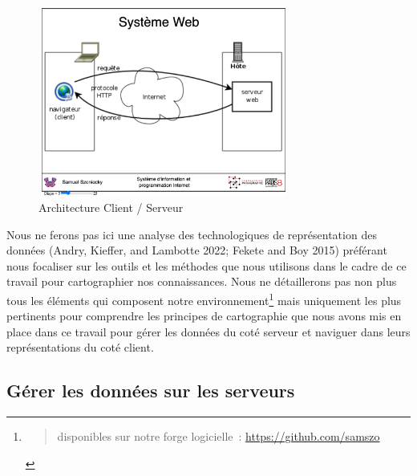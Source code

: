 \documentclass[
  letterpaper,
  DIV=11,
  numbers=noendperiod]{scrreprt}
\begin{document}
\begin{figure}

{\centering \includegraphics[width=8.269cm,height=6.253cm]{media/1000000100000708000005788D09F0CE68E86891.png}

}

\caption{\label{fig-ArchitectureClientServeur}Architecture Client /
Serveur}

\end{figure}

Nous ne ferons pas ici une analyse des technologiques de représentation
des données (Andry, Kieffer, and Lambotte 2022; Fekete and Boy 2015)
préférant nous focaliser sur les outils et les méthodes que nous
utilisons dans le cadre de ce travail pour cartographier nos
connaissances. Nous ne détaillerons pas non plus tous les éléments qui
composent notre environnement\footnote{\begin{quote}
  disponibles sur notre forge logicielle~:
  \url{https://github.com/samszo}
  \end{quote}} mais uniquement les plus pertinents pour comprendre les
principes de cartographie que nous avons mis en place dans ce travail
pour gérer les données du coté serveur et naviguer dans leurs
représentations du coté client.

\hypertarget{sec-gestDonneesServeurs}{%
\subsection{Gérer les données sur les
serveurs}\label{sec-gestDonneesServeurs}}
\end{document}

